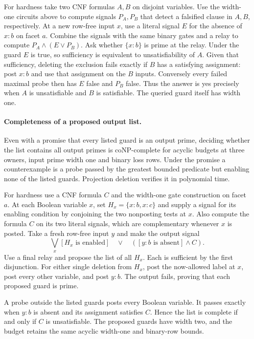 For hardness take two CNF formulas $A,B$
on disjoint variables. Use the width-one
circuits above to compute signals $P_A,P_B$
that detect a falsified clause in $A,B$,
respectively. At a new row-free input $x$,
use a literal signal $E$ for the absence
of $x:b$ on facet $a$. Combine the signals
with the same binary gates and a relay to
compute $P_A\land(E\lor P_B)$. Ask whether
$\{x:b\}$ is prime at the relay. Under the
guard $E$ is true, so sufficiency is
equivalent to unsatisfiability of $A$.
Given that sufficiency, deleting the
exclusion fails exactly if $B$ has a
satisfying assignment: post $x:b$ and use
that assignment on the $B$ inputs.
Conversely every failed maximal probe then
has $E$ false and $P_B$ false. Thus the
answer is yes precisely when $A$ is
unsatisfiable and $B$ is satisfiable.
The queried guard itself has width one.

\paragraph{Completeness of a proposed output list.}
Even with a promise that every listed guard is
an output prime, deciding whether the list
contains all output primes is coNP-complete
for acyclic budgets at three owners, input
prime width one and binary loss rows.
Under the promise a counterexample is a probe
passed by the greatest bounded predicate
but enabling none of the listed guards.
Projection deletion verifies it in polynomial
time.

For hardness use a CNF formula $C$ and
the width-one gate construction on facet
$a$. At each Boolean variable $x$, set
$H_x=\{x:b,x:c\}$ and supply a signal for its
enabling condition by conjoining the two
nonposting tests at $x$. Also compute the
formula $C$ on its two literal signals,
which are complementary whenever $x$ is
posted. Take a fresh row-free input $y$
and make the output signal
\[
 \bigvee_x [H_x\text{ is enabled}]
 \quad\lor\quad ([y:b\text{ is absent}]\land C).
\]
Use a final relay and propose the list of
all $H_x$. Each is sufficient by the first
disjunction. For either single deletion
from $H_x$, post the now-allowed label
at $x$, post every other variable, and
post $y:b$. The output fails, proving
that each proposed guard is prime.

A probe outside the listed guards posts
every Boolean variable. It passes exactly
when $y:b$ is absent and its assignment
satisfies $C$. Hence the list is complete
if and only if $C$ is unsatisfiable.
The proposed guards have width two, and
the budget retains the same acyclic
width-one and binary-row bounds.

